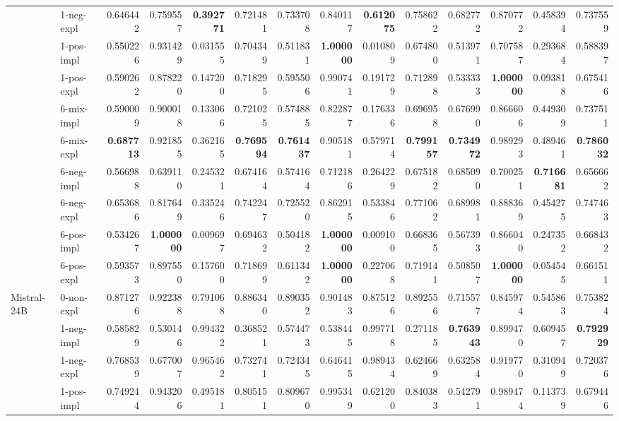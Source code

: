 \begin{tabular}{ll|rrrr|rrrr|rrrr}
 & 1-neg-expl & 0.646442 & 0.759557 & \bfseries 0.392771 & 0.721481 & 0.733708 & 0.840117 & \bfseries 0.612075 & 0.758622 & 0.682772 & 0.870772 & 0.458394 & 0.737559 \\
 & 1-pos-impl & 0.550226 & 0.931429 & 0.031555 & 0.704349 & 0.511831 & \bfseries 1.000000 & 0.010809 & 0.674800 & 0.513971 & 0.707587 & 0.293684 & 0.588397 \\
 & 1-pos-expl & 0.590262 & 0.878220 & 0.147200 & 0.718295 & 0.595506 & 0.990741 & 0.191729 & 0.712898 & 0.533333 & \bfseries 1.000000 & 0.093818 & 0.675416 \\
 & 6-mix-impl & 0.590009 & 0.900018 & 0.133066 & 0.721025 & 0.574885 & 0.822877 & 0.176336 & 0.696958 & 0.676990 & 0.866606 & 0.449309 & 0.737511 \\
 & 6-mix-expl & \bfseries 0.687713 & 0.921855 & 0.362165 & \bfseries 0.769594 & \bfseries 0.761437 & 0.905181 & 0.579714 & \bfseries 0.799157 & \bfseries 0.734972 & 0.989293 & 0.489461 & \bfseries 0.786032 \\
 & 6-neg-impl & 0.566988 & 0.639110 & 0.245321 & 0.674164 & 0.574164 & 0.712186 & 0.264229 & 0.675182 & 0.685090 & 0.700251 & \bfseries 0.716681 & 0.656662 \\
 & 6-neg-expl & 0.653686 & 0.817649 & 0.335246 & 0.742247 & 0.725520 & 0.862915 & 0.533846 & 0.771062 & 0.689981 & 0.888369 & 0.454275 & 0.747463 \\
 & 6-pos-impl & 0.534267 & \bfseries 1.000000 & 0.009697 & 0.694632 & 0.504182 & \bfseries 1.000000 & 0.009100 & 0.668365 & 0.567393 & 0.866040 & 0.247352 & 0.668432 \\
 & 6-pos-expl & 0.593573 & 0.897550 & 0.157600 & 0.718699 & 0.611342 & \bfseries 1.000000 & 0.227068 & 0.719141 & 0.508507 & \bfseries 1.000000 & 0.054545 & 0.661511 \\
 \midrule
\multirow[t]{11}{*}{Mistral-24B} & 0-non-expl & 0.871276 & 0.922388 & 0.791068 & 0.886340 & 0.890352 & 0.901483 & 0.875126 & 0.892556 & 0.715577 & 0.845974 & 0.545863 & 0.753824 \\
 & 1-neg-impl & 0.585829 & 0.530146 & 0.994322 & 0.368521 & 0.574473 & 0.538445 & 0.997718 & 0.271185 & \bfseries 0.763943 & 0.899470 & 0.609457 & \bfseries 0.792929 \\
 & 1-neg-expl & 0.768539 & 0.677007 & 0.965462 & 0.732741 & 0.724345 & 0.646415 & 0.989434 & 0.624669 & 0.632584 & 0.919770 & 0.310949 & 0.720376 \\
 & 1-pos-impl & 0.749244 & 0.943206 & 0.495181 & 0.805151 & 0.809670 & 0.995349 & 0.621200 & 0.840383 & 0.542791 & 0.989474 & 0.113739 & 0.679446 \\

\end{tabular}
